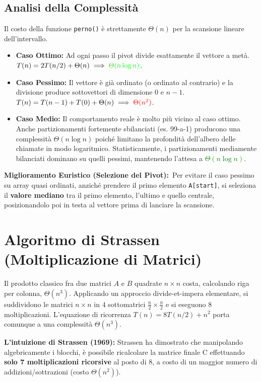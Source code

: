 \documentclass[12pt, a4paper]{article}
\begin{document}
\subsection{Analisi della Complessità}
Il costo della funzione \texttt{perno()} è strettamente $\Theta(n)$ per la scansione lineare dell'intervallo.
\begin{itemize}
\item \textbf{Caso Ottimo:} Ad ogni passo il pivot divide esattamente il vettore a metà. $T(n) = 2T(n/2) + \Theta(n) \implies \textcolor{green}{\Theta(n \log n)}$.
\item \textbf{Caso Pessimo:} Il vettore è già ordinato (o ordinato al contrario) e la divisione produce sottovettori di dimensione $0$ e $n-1$. $T(n) = T(n-1) + T(0) + \Theta(n) \implies \textcolor{red}{\Theta(n^2)}$.
\item \textbf{Caso Medio:} Il comportamento reale è molto più vicino al caso ottimo. Anche partizionamenti fortemente sbilanciati (es. 99-a-1) producono una complessità $\Theta(n \log n)$ poiché limitano la profondità dell'albero delle chiamate in modo logaritmico. Statisticamente, i partizionamenti mediamente bilanciati dominano su quelli pessimi, mantenendo l'attesa a \textcolor{green}{$\Theta(n \log n)$}.
\end{itemize}

\textbf{Miglioramento Euristico (Selezione del Pivot):}\
Per evitare il caso pessimo su array quasi ordinati, anziché prendere il primo elemento \texttt{A[start]}, si seleziona il \textbf{valore mediano} tra il primo elemento, l'ultimo e quello centrale, posizionandolo poi in testa al vettore prima di lanciare la scansione.

\newpage

\section{Algoritmo di Strassen (Moltiplicazione di Matrici)}

Il prodotto classico fra due matrici $A$ e $B$ quadrate $n \times n$ costa, calcolando riga per colonna, \textbf{$\Theta(n^3)$}.
Applicando un approccio divide-et-impera elementare, si suddividono le matrici $n \times n$ in $4$ sottomatrici $\frac{n}{2} \times \frac{n}{2}$ e si eseguono 8 moltiplicazioni. L'equazione di ricorrenza $T(n) = 8T(n/2) + n^2$ porta comunque a una complessità $\Theta(n^3)$.

\textbf{L'intuizione di Strassen (1969):}
Strassen ha dimostrato che manipolando algebricamente i blocchi, è possibile ricalcolare la matrice finale C effettuando \textbf{solo 7 moltiplicazioni ricorsive} al posto di 8, a costo di un maggior numero di addizioni/sottrazioni (costo $\Theta(n^2)$).
\end{document}
